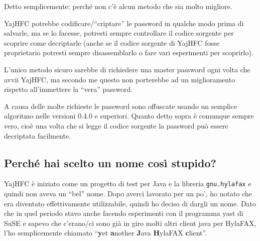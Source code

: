 \documentclass[a4paper,10pt]{scrartcl}
\begin{document}
Detto semplicemente: perché non c'è alcun metodo che sia molto migliore.

YajHFC potrebbe codificare/``criptare'' le password in qualche modo prima di salvarle, ma se lo facesse, 
potresti sempre controllare il codice sorgente per scoprire come decriptarle
(anche se il codice sorgente di YajHFC fosse proprietario potresti sempre disassemblarlo
o fare vari esperimenti per scoprirlo).

L'unico metodo sicuro sarebbe di richiedere una master password ogni volta
che avvii YajHFC, ma secondo me questo non porterebbe ad un miglioramento rispetto
all'immettere la ``vera'' password.

A causa delle molte richieste le password sono offuscate usando un semplice algoritmo nelle versioni 0.4.0 e superiori.
Quanto detto sopra è comunque sempre vero, cioè una volta che si legge il codice sorgente la password può essere decriptata facilmente.

\subsection{Perché hai scelto un nome così stupido?}

YajHFC è iniziato come un progetto di test per Java e la libreria \texttt{gnu.hylafax} e quindi
non aveva un ``bel'' nome. Dopo averci lavorato per un po', ho notato che era diventato 
effettivamente utilizzabile, quindi ho deciso di dargli un nome.
Dato che in quel periodo stavo anche facendo esperimenti con il programma yast di SuSE e sapevo che
c'erano/ci sono già in giro molti altri client java per HylaFAX, l'ho semplicemente chiamato
``\textbf{y}et \textbf{a}nother \textbf{J}ava \textbf{H}ylaFAX \textbf{c}lient''. 
\end{document}
